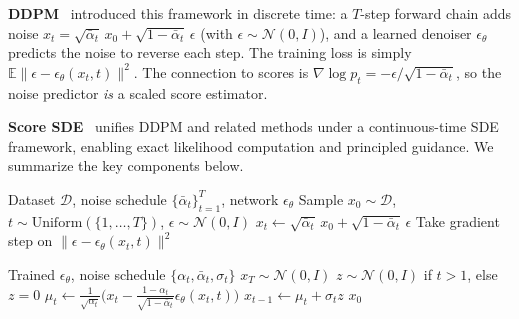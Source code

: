 \documentclass[11pt,letterpaper]{article}
\theoremstyle{plain}
\theoremstyle{definition}
\theoremstyle{remark}
\newcommand{\E}{\mathbb{E}}
\newcommand{\calN}{\mathcal{N}}
\newcommand{\grad}{\nabla}
\newcommand{\norm}[1]{\lVert #1\rVert}
\begin{document}
\textbf{DDPM}~\citep{ho2020ddpm} introduced this framework in
discrete time: a $T$-step forward chain adds noise
$x_t=\sqrt{\bar\alpha_t}\,x_0+\sqrt{1-\bar\alpha_t}\,\epsilon$ (with
$\epsilon\sim\calN(0,I)$), and a learned denoiser $\epsilon_\theta$
predicts the noise to reverse each step.  The training loss is simply
$\E\norm{\epsilon-\epsilon_\theta(x_t,t)}^2$.  The connection to
scores is $\grad\log p_t=-\epsilon/\sqrt{1-\bar\alpha_t}$, so the
noise predictor \emph{is} a scaled score estimator.

\textbf{Score SDE}~\citep{song2021score} unifies DDPM and related
methods under a continuous-time SDE framework, enabling exact
likelihood computation and principled guidance.  We summarize the key
components below.

\begin{algorithm}[ht]
\caption{DDPM Training}\label{alg:ddpm-train}
\begin{algorithmic}[1]
\Require Dataset $\mathcal{D}$, noise schedule $\{\bar\alpha_t\}_{t=1}^T$, network $\epsilon_\theta$
\Repeat
  \State Sample $x_0\sim\mathcal{D}$, $t\sim\mathrm{Uniform}(\{1,\ldots,T\})$, $\epsilon\sim\calN(0,I)$
  \State $x_t\gets\sqrt{\bar\alpha_t}\,x_0+\sqrt{1-\bar\alpha_t}\,\epsilon$ 
  \State Take gradient step on $\norm{\epsilon-\epsilon_\theta(x_t,t)}^2$
\end{algorithmic}
\end{algorithm}

\begin{algorithm}[ht]
\caption{DDPM Sampling (Reverse Process)}\label{alg:ddpm-sample}
\begin{algorithmic}[1]
\Require Trained $\epsilon_\theta$, noise schedule $\{\alpha_t,\bar\alpha_t,\sigma_t\}$
\State $x_T\sim\calN(0,I)$
  \State $z\sim\calN(0,I)$ if $t>1$, else $z=0$
  \State $\mu_t\gets\frac{1}{\sqrt{\alpha_t}}\bigl(x_t-\frac{1-\alpha_t}{\sqrt{1-\bar\alpha_t}}\epsilon_\theta(x_t,t)\bigr)$
  \State $x_{t-1}\gets\mu_t+\sigma_tz$ 
\EndFor
\State \Return $x_0$
\end{algorithmic}
\end{algorithm}
\end{document}
